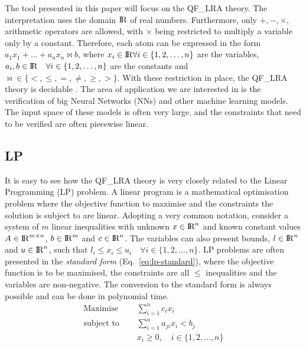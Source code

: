 \documentclass[runningheads]{llncs}
\begin{document}
The tool presented in this paper will focus on the QF\_LRA theory.
The interpretation uses the domain ${\rm I\!R}$ of real numbers.
Furthermore, only $+, -, \times,$ arithmetic operators are allowed, with $\times$ being restricted to multiply a variable only by a constant.
Therefore, each atom can be expressed in the form $a_1x_1 + \ldots + a_nx_n \bowtie b$, where $x_i \in {\rm I\!R} \forall i \in \{1, 2, \dots, n\}$ are the variables, $a_i, b \in {\rm I\!R} \quad \forall i \in \{1, 2, \dots, n\}$ are the constants and $\bowtie \in \{<, \le, =, \ne, \ge, >\}$.
With these restriction in place, the QF\_LRA theory is decidable \cite{ref:decidable-lra}.
The area of application we are interested in is the verification of big Neural Networks (NNs) and other machine learning models.
The input space of these models is often very large, and the constraints that need to be verified are often piecewise linear.

\subsection{LP}
\label{sec:lp}

It is easy to see how the QF\_LRA theory is very closely related to the Linear Programming (LP) problem.
A linear program is a mathematical optimisation problem where the objective function to maximise and the constraints the solution is subject to are linear.
Adopting a very common notation, consider a system of $m$ linear inequalities with unknown $x \in {\rm I\!R}^n$ and known constant values $A \in {\rm I\!R}^{m \times n}$, $b \in {\rm I\!R}^m$ and $c \in {\rm I\!R}^n$.
The variables can also present bounds, $l \in {\rm I\!R}^n$ and $u \in {\rm I\!R}^n$, such that $l_i \le x_i \le u_i \quad \forall i \in \{1, 2, \ldots, n\}$.
LP problems are often presented in the \textit{standard form} (Eq.~\ref{eq:lp-standard}), where the objective function is to be maximised, the constraints are all $\le$ inequalities and the variables are non-negative.
The conversion to the standard form is always possible and can be done in polynomial time.
\begin{equation}
    \label{eq:lp-standard}
    \begin{split}
        \text{Maximise }   \quad & \sum_{i=1}^{n} c_i x_i                      \\
        \text{subject to } \quad & \sum_{i=1}^{n} a_{ji}x_{i} < b_j            \\
                                 & x_i \ge 0,  \quad i \in \{1, 2, \ldots, n\}
    \end{split}
\end{equation}
\end{document}
